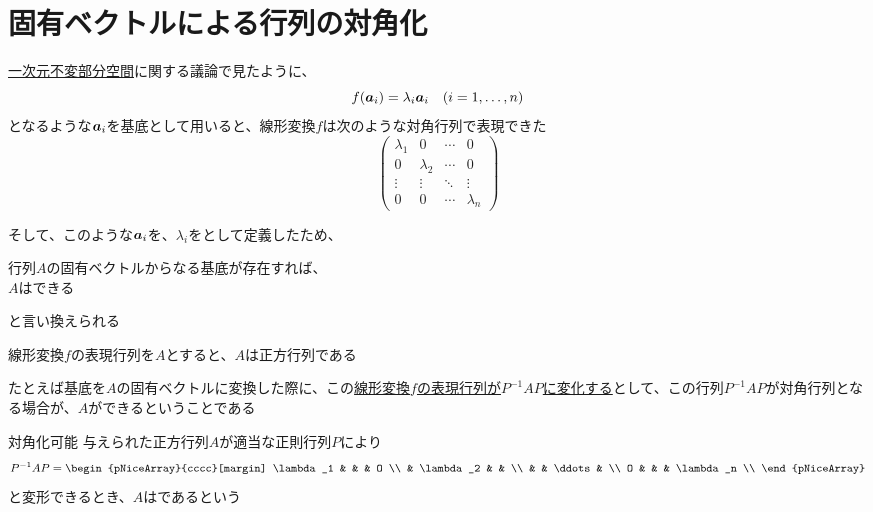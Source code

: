 \documentclass[../../../topic_linear-algebra]{subfiles}
\begin{document}
\sectionline
\section{固有ベクトルによる行列の対角化}

\hyperref[sec:1d-invariant-subspaces]{一次元不変部分空間}に関する議論で見たように、
\begin{equation*}
  f(\vb*{a}_i) = \lambda_i \vb*{a}_i \quad (i = 1, \dots, n)
\end{equation*}
となるような$\vb*{a}_i$を基底として用いると、線形変換$f$は次のような対角行列で表現できた
\begin{equation*}
  \begin{pmatrix}
    \lambda_1 & 0         & \cdots & 0         \\
    0         & \lambda_2 & \cdots & 0         \\
    \vdots    & \vdots    & \ddots & \vdots    \\
    0         & 0         & \cdots & \lambda_n
  \end{pmatrix}
\end{equation*}

そして、このような$\vb*{a}_i$を、$\lambda_i$をとして定義したため、
\begin{shaded}
  行列$A$の固有ベクトルからなる基底が存在すれば、\\
  $A$はできる
\end{shaded}
と言い換えられる

\sectionline

線形変換$f$の表現行列を$A$とすると、$A$は正方行列である

\br

たとえば基底を$A$の固有ベクトルに変換した際に、この\hyperref[thm:similarity-under-basis-change]{線形変換$f$の表現行列が$P^{-1}AP$に変化する}として、この行列$P^{-1}AP$が対角行列となる場合が、$A$ができるということである

\begin{definition}{対角化可能}\label{def:diagonalizable}
  与えられた正方行列$A$が適当な正則行列$P$により
  \begin{equation*}
    P^{-1}AP = \begin{pNiceArray}{cccc}[margin]
      \lambda_1 & & & O \\
      & \lambda_2 & & \\
      & & \ddots & \\
      O & & & \lambda_n \\
    \end{pNiceArray}
  \end{equation*}
  と変形できるとき、$A$はであるという
\end{definition}
\end{document}
